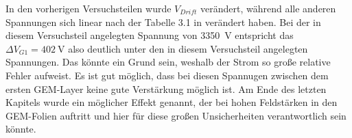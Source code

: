 In den vorherigen Versuchsteilen wurde $V_{Drift}$ verändert, während alle anderen Spannungen sich linear nach der Tabelle 3.1 in \cite{Anleitungsmappe} verändert haben. Bei der in diesem Versuchsteil angelegten Spannung von \SI{3350}{\V} entspricht das $\Delta V_{G1} = \SI{402}{\V}$ also deutlich unter den in diesem Versuchsteil angelegten Spannungen. Das könnte ein Grund sein, weshalb der Strom so große relative Fehler aufweist. Es ist gut möglich, dass bei diesen Spannugen zwischen dem ersten GEM-Layer keine gute Verstärkung möglich ist. Am Ende des letzten Kapitels wurde ein möglicher Effekt genannt, der bei hohen Feldstärken in den GEM-Folien auftritt und hier für diese großen Unsicherheiten verantwortlich sein könnte. 



